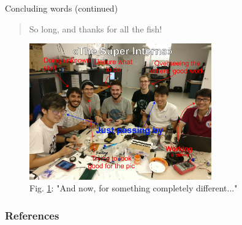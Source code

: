 \documentclass{beamer}
\begin{document}
	\begin{frame}{Concluding words (continued)}
		\begin{quote}
			So long, and thanks for all the fish!
		\end{quote}
		\begin{figure}
			\includegraphics[width=0.7\textwidth]{the_great_interns}
			\caption{\label{figure:The Great Interns}Fig. \ref{figure:The Great Interns}: "And now, for something completely different..."}
		\end{figure}
	\end{frame}
	\begin{frame}[allowframebreaks]
		\frametitle{References}
		
		
	\end{frame}
\end{document}
